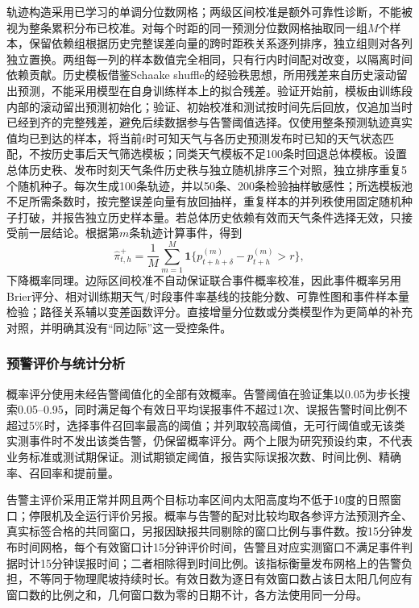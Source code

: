 轨迹构造采用已学习的单调分位数网格；两级区间校准是额外可靠性诊断，不能被视为整条累积分布已校准。对每个时距的同一预测分位数网格抽取同一组$M$个样本，保留依赖组根据历史完整误差向量的跨时距秩关系逐列排序，独立组则对各列独立置换。两组每一列的样本数值完全相同，只有行内时间配对改变，以隔离时间依赖贡献。历史模板借鉴Schaake shuffle的经验秩思想\cite{clark2004schaake,schefzik2013ecc}，所用残差来自历史滚动留出预测，不能采用模型在自身训练样本上的拟合残差。验证开始前，模板由训练段内部的滚动留出预测初始化；验证、初始校准和测试按时间先后回放，仅追加当时已经到齐的完整残差，避免后续数据参与告警阈值选择。仅使用整条预测轨迹真实值均已到达的样本，将当前$t$时可知天气与各历史预测发布时已知的天气状态匹配，不按历史事后天气筛选模板；同类天气模板不足100条时回退总体模板。设置总体历史秩、发布时刻天气条件历史秩与独立随机排序三个对照，独立排序重复5个随机种子。每次生成100条轨迹，并以50条、200条检验抽样敏感性；所选模板池不足所需条数时，按完整误差向量有放回抽样，重复样本的并列秩使用固定随机种子打破，并报告独立历史样本量。若总体历史依赖有效而天气条件选择无效，只接受前一层结论。根据第$m$条轨迹计算事件，得到
\[
\widehat\pi^+_{t,h}=\frac{1}{M}\sum_{m=1}^{M}
\mathbf{1}\{p^{(m)}_{t+h+\delta}-p^{(m)}_{t+h}>r\},
\]
下降概率同理。边际区间校准不自动保证联合事件概率校准，因此事件概率另用Brier评分、相对训练期天气/时段事件率基线的技能分数、可靠性图和事件样本量检验；路径关系辅以变差函数评分\cite{scheuerer2015variogram}。直接增量分位数或分类模型作为更简单的补充对照，并明确其没有“同边际”这一受控条件。

\subsubsection{预警评价与统计分析}
概率评分使用未经告警阈值化的全部有效概率。告警阈值在验证集以0.05为步长搜索0.05--0.95，同时满足每个有效日平均误报事件不超过1次、误报告警时间比例不超过5\%时，选择事件召回率最高的阈值；并列取较高阈值，无可行阈值或无该类实测事件时不发出该类告警，仍保留概率评分。两个上限为研究预设约束，不代表业务标准或测试期保证。测试期锁定阈值，报告实际误报次数、时间比例、精确率、召回率和提前量。

告警主评价采用正常并网且两个目标功率区间内太阳高度均不低于10度的日照窗口；停限机及全运行评价另报。概率与告警的配对比较均取各参评方法预测齐全、真实标签合格的共同窗口，另报因缺报共同剔除的窗口比例与事件数。按15分钟发布时间网格，每个有效窗口计15分钟评价时间，告警且对应实测窗口不满足事件判据时计15分钟误报时间；二者相除得到时间比例。该指标衡量发布网格上的告警负担，不等同于物理爬坡持续时长。有效日数为逐日有效窗口数占该日太阳几何应有窗口数的比例之和，几何窗口数为零的日期不计，各方法使用同一分母。

